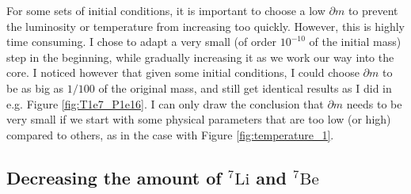 \documentclass[a4paper, 11pt, english]{article}
\newcommand{\refig}[1]{\textcolor{blue}{\ref{fig:#1}}} %
\begin{document}
For some sets of initial conditions, it is important to choose a low $\partial m$ to
prevent the luminosity or temperature from increasing too quickly. However, this is highly
time consuming. I chose to adapt a very small (of order $10^{-10}$ of the initial mass)
step in
the beginning, while gradually increasing it as we work our way into the core. I noticed
however that given some initial conditions, I could choose $\partial m$ to be as big as
$1/100$ of the original mass, and still get identical results as I did in e.g. Figure
\refig{T1e7_P1e16}. I can only draw the conclusion that $\partial m$ needs to be very
small if we start with some physical parameters that are too low (or high) compared to
others, as in the case with Figure \refig{temperature_1}.

\subsection{Decreasing the amount of $^{7}\mathrm{Li}$ and $^{7}\mathrm{Be}$}
\end{document}
